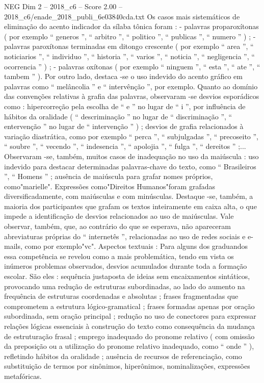\begin{textsample}{NEG Dim 2 – 2018\_c6 – Score 2.00 – 2018\_c6/enade\_2018\_publi\_6e03840cda.txt}
Os casos mais sistemáticos de eliminação do acento indicador da sílaba tônica foram : - palavras proparoxítonas ( por exemplo “ generos ”, “ arbitro ”, “ politico ”, “ publicas ”, “ numero ” ) ; - palavras paroxítonas terminadas em ditongo crescente ( por exemplo “ area ”, “ noticiarios ”, “ individuo ”, “ historia ”, “ varios ”, “ noticia ”, “ negligencia ”, “ ocorrencia ” ) ; - palavras oxítonas ( por exemplo “ ninguem ”, “ esta ”, “ ate ”, “ tambem ” ).
Por outro lado, destaca -se o uso indevido do acento gráfico em palavras como “ melâncolia ” e “ intervênção ”, por exemplo.
Quanto ao domínio das convenções relativas à grafia das palavras, observaram -se desvios esporádicos como : hipercorreção pela escolha de “ e ” no lugar de “ i ”, por influência de hábitos da oralidade ( “ descriminação ” no lugar de “ discriminação ”, “ entervenção ” no lugar de “ intervenção ” ) ; desvios de grafia relacionados à variação diastrática, como por exemplo “ perca ”, “ subjulgadas ”, “ precoseito ”, “ soubre ”, “ vecendo ”, “ indesencia ”, “ apolojia ”, “ fulga ”, “ dereitos ” ;...
Observaram -se, também, muitos casos de inadequação no uso da maiúscula : uso indevido para destacar determinadas palavras-chave do texto, como “ Brasileiros ”, “ Homens ” ; ausência de maiúscula para grafar nomes próprios, como"marielle".
Expressões como"Direitos Humanos"foram grafadas diversificadamente, com maiúsculas e com minúsculas.
Destaque -se, também, a maioria dos participantes que grafam os textos inteiramente em caixa alta, o que impede a identificação de desvios relacionados ao uso de maiúsculas.
Vale observar, também, que, ao contrário do que se esperava, não apareceram abreviaturas próprias do “ internetês ”, relacionadas ao uso de redes sociais e e-mails, como por exemplo"vc".
Aspectos textuais : Para alguns dos graduandos essa competência se revelou como a mais problemática, tendo em vista os inúmeros problemas observados, desvios acumulados durante toda a formação escolar.
São eles : sequência justaposta de ideias sem encaixamentos sintáticos, provocando uma redução de estruturas subordinadas, ao lado do aumento na frequência de estruturas coordenadas e absolutas ; frases fragmentadas que comprometem a estrutura lógico-gramatical ; frases formadas apenas por oração subordinada, sem oração principal ; redução no uso de conectores para expressar relações lógicas essenciais à construção do texto como consequência da mudança de estruturação frasal ; emprego inadequado do pronome relativo ( com omissão da preposição ou a utilização do pronome relativo inadequado, como “ onde ” ), refletindo hábitos da oralidade ; ausência de recursos de referenciação, como substituição de termos por sinônimos, hiperônimos, nominalizações, expressões metafóricas.

\end{textsample}

